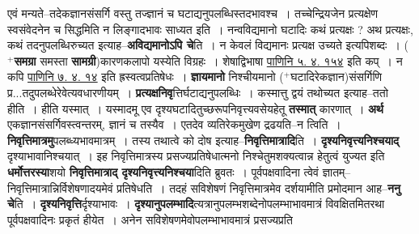 \documentclass[article,12pt,a4paper]{memoir}
\newcommand{\add}[1]{($^{+}$#1)}
\begin{document}
	  \pstart एवं मन्यते--तदेकज्ञानसंसर्गि वस्तु तज्ज्ञानं च घटाद्यनुपलब्धिस्तदभावश्च । तच्चेन्द्रियजेन प्रत्यक्षेण स्वसंवेदनेन च सिद्धमिति न लिङ्गादभावः साध्यत इति । नन्वविद्यमानो घटादिः कथं प्रत्यक्षः ? अथ प्रत्यक्षः, कथं तदनुपलब्धिरुच्यत इत्याह--\textbf{अविद्यमानोऽपि चे}ति । न केवलं विद्यमानः प्रत्यक्ष उच्यते इत्यपिशब्दः । \add{\textbf{समग्रा} समस्ता \textbf{सामग्री}}कारणकलापो यस्येति विग्रहः । शेषाद्विभाषा \href{http://sarit.indology.info/?cref=Pā.5.4.154}{पाणिनि ५. ४. १५४} इति कप् । न कपि \href{http://sarit.indology.info/?cref=Pā.7.4.14}{पाणिनि ७. ४. १४} इति ह्रस्वत्वप्रतिषेधः । \textbf{ज्ञायमानो} निश्चीयमानो \add{घटादिरेकज्ञान}संसर्गिणि प्र...तदुपलब्धेरेवेत्यवधारणीयम् । \textbf{प्रत्यक्षनिवृ}त्तिर्घटाद्यनुपलब्धिः । कस्मात्तु द्वयं तथोच्यत इत्याह--ततो हीति । हीति यस्मात् । यस्मादमू एव दृश्यघटादितुच्छरूपनिवृत्त्यवसेयहेतू \textbf{तस्मात्} कारणात् । \textbf{अर्थ} एकज्ञानसंसर्गिवस्त्वन्तरम्, ज्ञानं च तस्यैव । एतदेव व्यतिरेकमुखेण द्रढयति--न त्विति । \textbf{निवृत्तिमात्रमु}पलब्ध्यभावमात्रम् । तस्य तथात्वे को दोष इत्याह--\textbf{निवृत्तिमात्रादि}ति । \textbf{दृश्यनिवृत्त्यनिश्चयाद्} दृश्याभावानिश्चयात् । इह निवृत्तिमात्रस्य प्रसज्यप्रतिषेधात्मनो निश्चेतुमशक्यत्वान्न हेतुत्वं युज्यत इति \textbf{धर्मोत्तरस्या}शयो \textbf{निवृत्तिमात्राद् दृश्यनिवृत्त्यनिश्चया}दिति ब्रुवतः । पूर्वपक्षवादिना त्वेवं ज्ञातम्--निवृत्तिमात्रान्निर्विशेषणादयमेवं प्रतिषेधति । तदहं सविशेषणं निवृत्तिमात्रमेव दर्शयामीति प्रमोदमान आह--\textbf{ननु चे}ति । \textbf{दृश्यनिवृत्ति}र्दृश्याभावः । \textbf{दृश्यानुपलम्भादि}त्यत्रानुपलम्भशब्देनोपलम्भाभावमात्रं विवक्षितमितरथा पूर्वपक्षवादिनः प्रकृतं हीयेत । अनेन सविशेषणमेवोपलम्भाभावमात्रं प्रसज्यप्रति  \leavevmode{} 
	  
\end{document}
